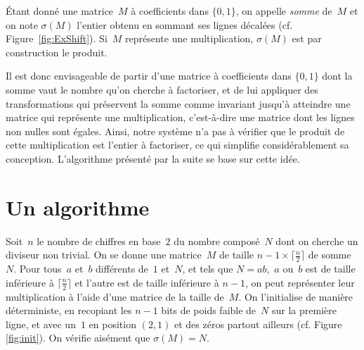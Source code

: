 
\begin{df*}
Étant donné une matrice~$M$ à coefficients dans $\{0,1\}$, on appelle \emph{somme} de~$M$ et on note $\sigma (M)$ l'entier obtenu en sommant ses lignes décalées (cf. Figure~\ref{fig:ExShift}). Si~$M$ représente une multiplication, $\sigma(M)$ est par construction le produit. 
\end{df*}



Il est donc envisageable de partir d'une matrice à coefficients dans $\{0,1\}$ dont la somme vaut le nombre qu'on cherche à factoriser, et de lui appliquer des transformations qui préservent la somme comme invariant jusqu'à atteindre une matrice qui représente une multiplication, c'est-à-dire une matrice dont les lignes non nulles sont égales. Ainsi, notre système n'a pas à vérifier que le produit de cette multiplication est l'entier à factoriser, ce qui simplifie considérablement sa conception. L'algorithme présenté par la suite se base sur cette idée.

\section{Un algorithme}

Soit~$n$ le nombre de chiffres en base~$2$ du nombre composé~$N$ dont on cherche un diviseur non trivial. On se donne une matrice~$M$ de taille $ n-1 \times \lceil \frac{n}{2}\rceil$ de somme~$N$. Pour tous~$a$ et~$b$ différents de~$1$ et~$N$, et tels que $N = ab$,~$a$ ou~$b$ est de taille inférieure à $\lceil\frac{n}{2}\rceil$ et l'autre est de taille inférieure à $n-1$, on peut représenter leur multiplication à l'aide d'une matrice de la taille de~$M$. On l'initialise de manière déterministe, en recopiant les $n-1$ bits de poids faible de~$N$ sur la première ligne, et avec un~$1$ en position $(2,1)$ et des zéros partout ailleurs (cf. Figure \ref{fig:init}). On vérifie aisément que $\sigma(M)=N$. 


